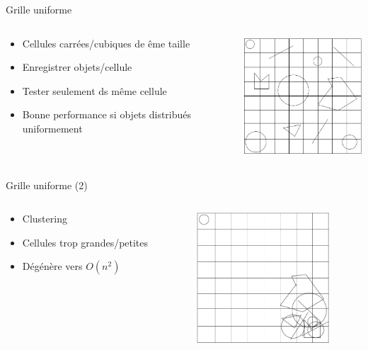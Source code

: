\documentclass{beamer}
\begin{document}
\begin{frame}{Grille uniforme}
	\begin{columns}[c]
	\begin{column}[T]{.5\textwidth}
		\begin{itemize}
		\item Cellules carrées/cubiques de ême taille
		\item Enregistrer objets/cellule
		\item Tester seulement ds même cellule
		\item Bonne performance si objets distribués uniformement
		\end{itemize}
	\end{column}
	\begin{column}[T]{.5\textwidth}
		\includegraphics[width=5cm]{unigrid.png}
	\end{column}
	\end{columns}
\end{frame}

\begin{frame}{Grille uniforme (2)}
	\begin{columns}[c]
	\begin{column}[T]{.5\textwidth}
		\begin{itemize}
		\item Clustering
		\item Cellules trop grandes/petites
		\item Dégénère vers $O(n^2)$
		\end{itemize}
	\end{column}
	\begin{column}[T]{.5\textwidth}
		\includegraphics[width=5cm]{unigrid2.png}
	\end{column}
	\end{columns}
\end{frame}
\end{document}
